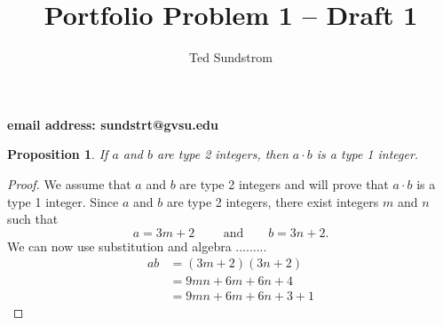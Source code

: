 \documentclass[12pt]{article}
\title{Portfolio Problem 1 -- Draft 1}
\author{Ted Sundstrom}
\theoremstyle{plain}
\newtheorem{proposition}[theorem]{Proposition}
\begin{document}
\maketitle

\begin{center}
\textbf{email address: sundstrt@gvsu.edu}
\end{center}

\begin{proposition}
If $a$ and $b$ are type 2 integers, then $a \cdot b$ is a type 1 integer.
\end{proposition}

\begin{proof}
We assume that $a$ and $b$ are type 2 integers and will prove that $a \cdot b$ is a type 1 integer.  Since $a$ and $b$ are type 2 integers, there exist integers $m$ and $n$ such that
\[
a = 3m + 2 \text{ ~~~~~~and~~~~~ } b = 3n + 2.
\]
We can now  use substitution and algebra .........
\begin{align*}
ab &= (3m + 2)(3n + 2) \\
    &= 9mn + 6m + 6n + 4 \\
    &= 9mn + 6m + 6n + 3 + 1
\end{align*}
\end{proof}
\end{document}
